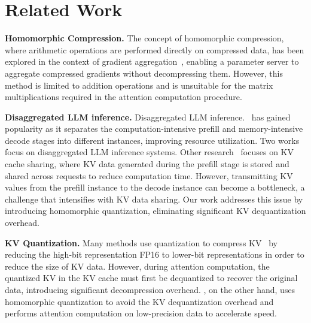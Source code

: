 \section{Related Work}
\medskip
\noindent \textbf{Homomorphic Compression.}
The concept of homomorphic compression, where arithmetic operations are performed directly on compressed data, has been explored in the context of gradient aggregation~\cite{thc2024li}, enabling a parameter server to aggregate compressed gradients without decompressing them. However, this method is limited to addition operations and is unsuitable for the matrix multiplications required in the attention computation procedure.

\medskip
\noindent \textbf{Disaggregated LLM inference.} Disaggregated LLM inference.~\cite{distserve, splitwise, mooncake, memserve, strati2024dejavukvcachestreamingfast} has gained popularity as it separates the computation-intensive prefill and memory-intensive decode stages into different instances, improving resource utilization.
Two works~\cite{distserve, splitwise, strati2024dejavukvcachestreamingfast} focus on disaggregated LLM inference systems. Other research~\cite{mooncake, memserve} focuses on KV cache sharing, where KV data generated during the prefill stage is stored and shared across requests to reduce computation time. However, transmitting KV values from the prefill instance to the decode instance can become a bottleneck, a challenge that intensifies with KV data sharing. Our work addresses this issue by introducing homomorphic quantization, eliminating significant KV dequantization overhead.


\medskip
\noindent\textbf{KV Quantization.}
Many methods use quantization to compress KV~\cite{zipcache, kang2024gear, kivi, cachegen, kvquant} by reducing the high-bit representation FP16 to lower-bit representations in order to reduce the size of KV data. %
However, during attention computation, the quantized KV in the KV cache must first be dequantized to recover the original data, introducing significant decompression overhead. \sys, on the other hand, uses homomorphic quantization to avoid the KV dequantization overhead and performs attention computation on low-precision data to accelerate speed.

